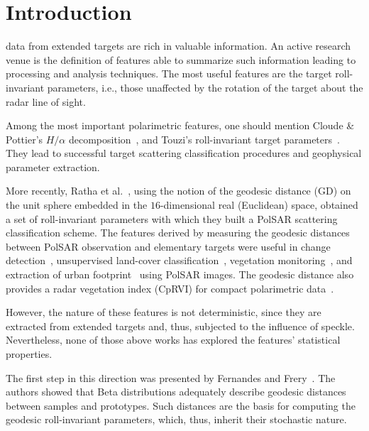\documentclass[journal]{IEEEtran}
\begin{document}
	\IEEEpeerreviewmaketitle
	
	\section{Introduction}
	
	data from extended targets are rich in valuable information.
	An active research venue is the definition of features able to summarize such information leading to processing and analysis techniques.
	The most useful features are the target roll-invariant parameters, i.e., those unaffected by the rotation of the target about the radar line of sight.
	
	Among the most important polarimetric features, one should mention Cloude \& Pottier's $H/\alpha$ decomposition~\cite{CloudePottier:97}, and Touzi's roll-invariant target parameters~\cite{Touzi:TGARS:2007}.
	They lead to successful target scattering classification procedures and geophysical parameter extraction.
	
	More recently, Ratha et al.~\cite{APolSARScatteringPowerFactorizationFrameworkandNovelRollInvariantParametersBasedUnsupervisedClassificationSchemeUsingaGeodesicDistanceinpress}, using the notion of the geodesic distance ($\text{GD}$) on the unit sphere embedded in the $16$-dimensional real (Euclidean) space, obtained a set of roll-invariant parameters with which they built a PolSAR scattering classification scheme. 
	The features derived by measuring the geodesic distances between PolSAR observation and elementary targets were useful in
	change detection~\cite{ChangeDetectionPolSARGeodesicDistanceBetweenScatteringMechanisms},
	unsupervised land-cover classification~\cite{ClassificationPolSARGeodesic}, 
	vegetation monitoring~\cite{AGeneralizedVolumeScatteringModelBasedVegetationIndexfromPolarimetricSARData2019}, and 
	extraction of urban footprint~\cite{NovelTechniquesforBuiltupAreaExtractionfromPolarimetricSARImages2019} using PolSAR images.
	The geodesic distance also provides a radar vegetation index (CpRVI) for compact polarimetric data~\cite{ARadarVegetationIndexforCropMonitoringUsingCompactPolarimetricSARData}. 
	
	However, the nature of these features is not deterministic, since they are extracted from extended targets and, thus, subjected to the influence of speckle.
	Nevertheless, none of those above works has explored the features' statistical properties.
	
	The first step in this direction was presented by Fernandes and Frery~\cite{StatisticalPropertiesofGeodesicDistancesBetweenSamplesandElementaryScatterersinPolSARImagery2019}.
	The authors showed that Beta distributions adequately describe geodesic distances between samples and prototypes.
	Such distances are the basis for computing the geodesic roll-invariant parameters, which, thus, inherit their stochastic nature.
	
\end{document}
